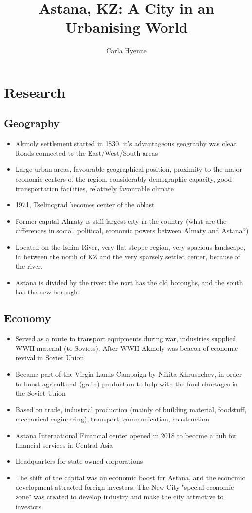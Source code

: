 \documentclass[12pt]{article}
\title{Astana, KZ: A City in an Urbanising World}
\author{Carla Hyenne}
\date{}
\begin{document}
\maketitle 

\section{Research}

\subsection{Geography}

\begin{itemize}
  \item Akmoly settlement started in 1830, it's advantageous geography was clear. Roads connected to the East/West/South areas
  \item Large urban areas, favourable geographical position, proximity to the major economic centers of the region, considerably demographic capacity, good transportation facilities, relatively favourable climate
  \item 1971, Tselinograd becomes center of the oblast
  \item Former capital Almaty is still largest city in the country (what are the differences in social, political, economic powers between Almaty and Astana?)
  \item Located on the Ishim River, very flat steppe region, very spacious landscape, in between the north of KZ and the very sparsely settled center, because of the river. 
  \item Astana is divided by the river: the nort has the old boroughs, and the south has the new boroughs
\end{itemize}

\subsection{Economy}

\begin{itemize}
  \item Served as a route to transport equipments during war, industries supplied WWII material (to Soviets). After WWII Akmoly was beacon of economic revival in Soviet Union
  \item Became part of the Virgin Lands Campaign by Nikita Khrushchev, in order to boost agricultural (grain) production to help with the food shortages in the Soviet Union
  \item Based on trade, industrial production (mainly of building material, foodstuff, mechanical engineering), transport, communication, construction
  \item Astana International Financial center opened in 2018 to become a hub for financial services in Central Asia
  \item Headquarters for state-owned corporations
  \item The shift of the capital was an economic boost for Astana, and the economic development attracted foreign investors. The New City "special economic zone" was created to develop industry and make the city attractive to investors
\end{itemize}
\end{document}
